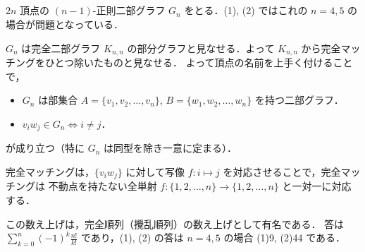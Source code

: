 \subsection{}
$2n$ 頂点の $(n-1)$-正則二部グラフ $G_n$ をとる．(1), (2) ではこれの $n=4, 5$ の場合が問題となっている．

$G_n$ は完全二部グラフ $K_{n,n}$ の部分グラフと見なせる．よって $K_{n,n}$ から完全マッチングをひとつ除いたものと見なせる．
よって頂点の名前を上手く付けることで，
\begin{itemize}
 \item $G_n$ は部集合 $A = \{v_1,v_2,\ldots,v_n\}$, $B = \{w_1,w_2,\ldots,w_n\}$ を持つ二部グラフ．
 \item $v_iw_j\in G_n \iff i \neq j$．
\end{itemize}
が成り立つ（特に $G_n$ は同型を除き一意に定まる）．

完全マッチングは，$\{v_iw_j\}$ に対して写像 $f\colon i\mapsto j$ を対応させることで，完全マッチングは
不動点を持たない全単射 $f\colon \{1,2,\ldots,n\}\longrightarrow  \{1,2,\ldots,n\}$ と一対一に対応する．

この数え上げは，完全順列（攪乱順列）の数え上げとして有名である．
答は $\sum_{k=0}^n (-1)^k\frac{n!}{k!}$ であり，(1), (2) の答は $n=4, 5$ の場合 (1)9, (2)44 である．